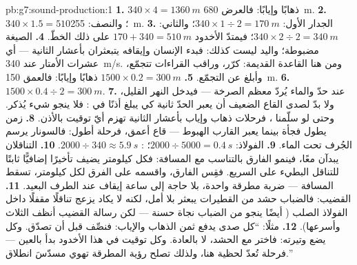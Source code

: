 \begin{solution}{pb:g7:sound-production:1}
\textbf{1.} $340 \times 4 = \qty{1360}{m}$ ذهابًا وإيابًا:
فالعرض \qty{680}{m}.
\textbf{2.} $340 \times 1.5 = 510$؛ والنصف: \qty{255}{m}.
\textbf{3.} الجدار الأول: $340 \times 1 \div 2 = \qty{170}{m}$؛
والثاني: $340 \times 2 \div 2 = \qty{340}{m}$؛ فيمتدّ الأخدود
$170 + 340 = \qty{510}{m}$ على ذلك الخطّ.
\textbf{4.} الصيغة مضبوطة؛ واليد ليست كذلك: فبدء الإنسان
وإيقافه يتبعثران بأعشار الثانية --- أي عشرات الأمتار عند
\qty{340}{m/s}. ومن هنا القاعدة القديمة: كرّر، وراقب القراءات
تتجمّع، وأبلغ عن التجمّع.
\textbf{5.} $1500 \times 0.2 = \qty{300}{m}$ ذهابًا وإيابًا:
فالعمق \qty{150}{m}.
\textbf{6.} $1500 \times 0.4 \div 2 = \qty{300}{m}$.
\textbf{7.} عند حدّ  والماء يُردّ معظم الصرخة --- فيدخل
النهر القليل، ولا بدّ لصدى القاع الضعيف أن يعبر الحدّ ثانية كي
يبلغ أذنًا في : فلا ينجو شيء يُذكر. وحتى لو سلّمنا
، فرحلات ذهاب وإياب بأعشار الثانية تهزم أيّ توقيت
بالأذن.
\textbf{8.} زمن  يطول فجأة بينما يعبر القارب الهبوط ---
قاع أعمق، فرحلة أطول: فالسونار يرسم الجُرف تحت الماء.
\textbf{9.} الفولاذ: $2000 \div 5000 = \qty{0.4}{s}$؛ :
$2000 \div 340 \approx \qty{5.9}{s}$.
\textbf{10.} التناقلان يبدآن معًا، فينمو الفارق بالتناسب مع
المسافة: فكل كيلومتر يضيف تأخيرًا إضافيًّا ثابتًا للتناقل
البطيء على السريع. فقِس الفارق، واقسمه على الفرق لكل كيلومتر،
تسقط المسافة --- ضربة مطرقة واحدة، بلا حاجة إلى ساعة إيقاف عند
الطرف البعيد.
\textbf{11.}  القضيب: فالضباب حشد من القطيرات يبعثر
\emph{} بلا أمل، لكنه لا يكاد يزعج تناقلًا مقفلًا داخل
الفولاذ الصلب (  أيضًا ينجو من الضباب نجاة حسنة ---
لكن رسالة القضيب أنظف الثلاث وأسرعها).
\textbf{12.} مثلًا: ``كل صدى يدفع ثمن الذهاب والإياب: فنصِّف
قبل أن تصدّق. وكل  يضع وتيرته: فاختر  مع الحشد، لا
بالعادة. وكل توقيت في هذا الأخدود بدأ بالعين --- فرحلة 
تُعدّ لحظية هنا، ولذلك تصلح رؤية المطرقة تهوي مسدّسَ
انطلاق.''
\end{solution}
